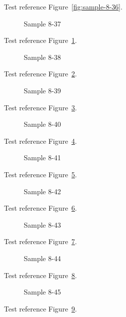 Test reference Figure~\ref{fig:sample-8-36}.

\begin{figure}[tbhp]
\caption{Sample 8-37}
\label{fig:sample-8-37}
\end{figure}

Test reference Figure~\ref{fig:sample-8-37}.

\begin{figure}[tbhp]
\caption{Sample 8-38}
\label{fig:sample-8-38}
\end{figure}

Test reference Figure~\ref{fig:sample-8-38}.

\begin{figure}[tbhp]
\caption{Sample 8-39}
\label{fig:sample-8-39}
\end{figure}

Test reference Figure~\ref{fig:sample-8-39}.

\begin{figure}[tbhp]
\caption{Sample 8-40}
\label{fig:sample-8-40}
\end{figure}

Test reference Figure~\ref{fig:sample-8-40}.

\begin{figure}[tbhp]
\caption{Sample 8-41}
\label{fig:sample-8-41}
\end{figure}

Test reference Figure~\ref{fig:sample-8-41}.

\begin{figure}[tbhp]
\caption{Sample 8-42}
\label{fig:sample-8-42}
\end{figure}

Test reference Figure~\ref{fig:sample-8-42}.

\begin{figure}[tbhp]
\caption{Sample 8-43}
\label{fig:sample-8-43}
\end{figure}

Test reference Figure~\ref{fig:sample-8-43}.

\begin{figure}[tbhp]
\caption{Sample 8-44}
\label{fig:sample-8-44}
\end{figure}

Test reference Figure~\ref{fig:sample-8-44}.

\begin{figure}[tbhp]
\caption{Sample 8-45}
\label{fig:sample-8-45}
\end{figure}

Test reference Figure~\ref{fig:sample-8-45}.

